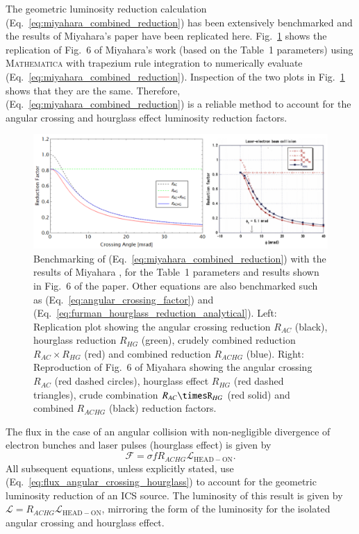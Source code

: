 \documentclass[../main.tex]{subfiles}
\begin{document}
The geometric luminosity reduction calculation (Eq.~\ref{eq:miyahara_combined_reduction}) has been extensively benchmarked and the results of Miyahara's paper \cite{miyahara2008luminosity} have been replicated here. Fig.~\ref{fig:miyahara_benchmarking} shows the replication of Fig.~6 of Miyahara's work \cite{miyahara2008luminosity} (based on the Table~1 parameters) using \textsc{Mathematica} with trapezium rule integration to numerically evaluate (Eq.~\ref{eq:miyahara_combined_reduction}). Inspection of the two plots in Fig.~\ref{fig:miyahara_benchmarking} shows that they are the same. Therefore, (Eq.~\ref{eq:miyahara_combined_reduction}) is a reliable method to account for the angular crossing and hourglass effect luminosity reduction factors. 
\begin{figure}[!h]
\centering
\includegraphics[width=\textwidth]{Figures/Photon_Production_by_Inverse_Compton_Scattering/miyahara_benchmarking.pdf}
\caption{Benchmarking of (Eq.~\ref{eq:miyahara_combined_reduction}) with the results of Miyahara \cite{miyahara2008luminosity}, for the Table~1 parameters and results shown in Fig.~6 of the paper. Other equations are also benchmarked such as (Eq.~\ref{eq:angular_crossing_factor}) and (Eq.~\ref{eq:furman_hourglass_reduction_analytical}). Left: Replication plot showing the angular crossing reduction $R_{AC}$ (black), hourglass reduction $R_{HG}$ (green), crudely combined reduction $R_{AC}\times R_{HG}$ (red) and combined reduction $R_{ACHG}$ (blue). Right: Reproduction of Fig.~6 of Miyahara \cite{miyahara2008luminosity} showing the angular crossing $R_{AC}$ (red dashed circles), hourglass effect $R_{HG}$ (red dashed triangles), crude combination $R_{AC}\timesR_{HG}$ (red solid) and combined $R_{ACHG}$ (black) reduction factors.}
\label{fig:miyahara_benchmarking}
\end{figure}

The flux in the case of an angular collision with non-negligible divergence of electron bunches and laser pulses (hourglass effect) is given by
\begin{equation}
\mathcal{F} = \sigma f R_{ACHG}\mathcal{L}_{\mathrm{HEAD-ON}}.
\label{eq:flux_angular_crossing_hourglass}
\end{equation}
All subsequent equations, unless explicitly stated, use (Eq.~\ref{eq:flux_angular_crossing_hourglass}) to account for the geometric luminosity reduction of an ICS source. The luminosity of this result is given by $\mathcal{L} = R_{ACHG}\mathcal{L}_{\mathrm{HEAD-ON}}$, mirroring the form of the luminosity for the isolated angular crossing and hourglass effect.
\end{document}
